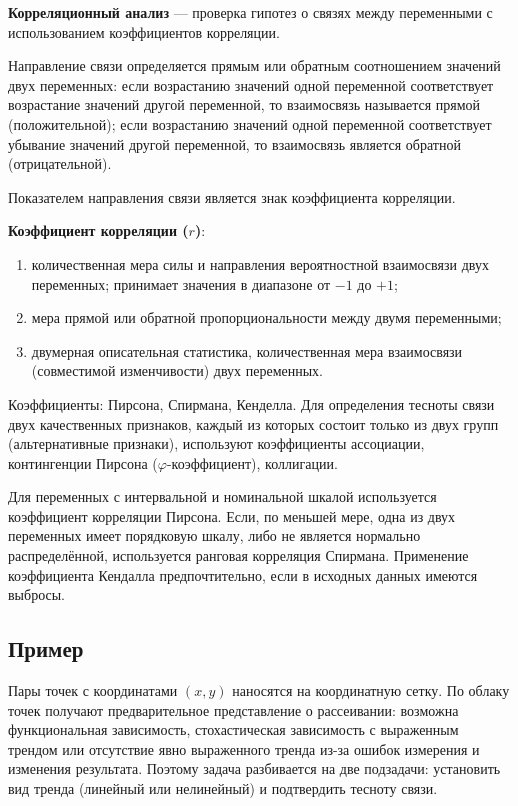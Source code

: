 \textbf{Корреляционный анализ} — проверка гипотез о связях между переменными с использованием коэффициентов корреляции.

Направление связи определяется прямым или обратным соотношением значений двух переменных: если возрастанию значений одной переменной соответствует возрастание значений другой переменной, то взаимосвязь называется прямой (положительной); если возрастанию значений одной переменной соответствует убывание значений другой переменной, то взаимосвязь является обратной (отрицательной).

Показателем направления связи является знак коэффициента корреляции.

\textbf{Коэффициент корреляции ($r$)}:
\begin{enumerate}
  \item количественная мера силы и направления вероятностной взаимосвязи двух переменных; принимает значения в диапазоне от $-1$ до $+1$;
  \item мера прямой или обратной пропорциональности между двумя переменными;
  \item двумерная описательная статистика, количественная мера взаимосвязи (совместимой изменчивости) двух переменных.
\end{enumerate}

Коэффициенты: Пирсона, Спирмана, Кенделла. Для определения тесноты связи двух качественных признаков, каждый из которых состоит только из двух групп (альтернативные признаки), используют коэффициенты ассоциации, контингенции Пирсона ($\varphi$-коэффициент), коллигации.

Для переменных с интервальной и номинальной шкалой используется коэффициент корреляции Пирсона. Если, по меньшей мере, одна из двух переменных имеет порядковую шкалу, либо не является нормально распределённой, используется ранговая корреляция Спирмана. Применение коэффициента Кендалла предпочтительно, если в исходных данных имеются выбросы.

\subsection*{Пример}

Пары точек с координатами $(x,y)$ наносятся на координатную сетку. По облаку точек получают предварительное представление о рассеивании: возможна функциональная зависимость, стохастическая зависимость с выраженным трендом или отсутствие явно выраженного тренда из-за ошибок измерения и изменения результата. Поэтому задача разбивается на две подзадачи: установить вид тренда (линейный или нелинейный) и подтвердить тесноту связи.

\clearpage
